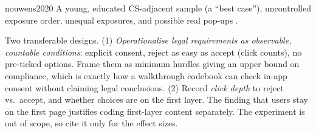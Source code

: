 \begin{papercard}{nouwens2020}
 A young, educated CS-adjacent sample (a ``best case''), uncontrolled exposure order, unequal exposures, and possible real pop-ups .

 Two transferable designs. (1) \emph{Operationalise legal requirements as observable, countable conditions}: explicit consent, reject as easy as accept (click counts), no pre-ticked options. Frame them as minimum hurdles giving an upper bound on compliance, which is exactly how a walkthrough codebook can check in-app consent without claiming legal conclusions. (2) Record \emph{click depth} to reject vs.\ accept, and whether choices are on the first layer. The finding that users stay on the first page justifies coding first-layer content separately. The experiment is out of scope, so cite it only for the effect sizes.
\end{papercard}

